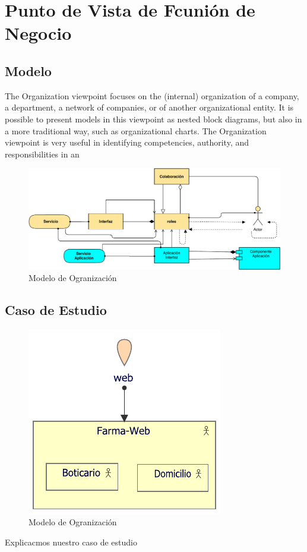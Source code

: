 \section{Punto de Vista de Fcunión de Negocio}
\subsection{Modelo}
The Organization viewpoint focuses on the (internal) organization of a company, a department, a network of companies, or of another organizational entity. It is possible to present models in this viewpoint as nested block diagrams, but also in a more traditional way, such as organizational charts. The Organization viewpoint is very useful in identifying competencies, authority, and responsibilities in an

\begin{figure}[h!]
	\centering
	\includegraphics[width=1\linewidth]{ARQUITECTURA/imgs/MOrganizacion}
	\caption{Modelo de Ogranización}
\end{figure}


\newpage
\subsection{Caso de Estudio}

\begin{figure}[h!]
	\centering
	\includegraphics[width=.5\linewidth]{ARQUITECTURA/imgs/COrganizacion}
	\caption{Modelo de Ogranización}
\end{figure}
Explicacmos nuestro caso de estudio
\newpage
